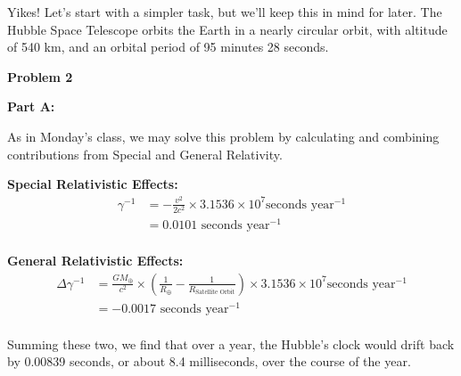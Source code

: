 \documentclass[12pt]{article}
\begin{document}
\begin{onehalfspacing}
Yikes! Let’s start with a simpler task, but we’ll keep this in mind for later. The Hubble Space Telescope orbits the Earth in a nearly circular orbit, with altitude of 540 km, and an orbital period of 95 minutes 28 seconds.
\fi

\raggedright{\textbf{\Large Problem 2}}\\
\raggedright{\textbf{\large Part A: }}

As in Monday's class, we may solve this problem by calculating and combining contributions from Special and General Relativity.

\bigskip

\textbf{Special Relativistic Effects:}
\begin{align*}
  \gamma^{-1} &= - \frac{v^2}{2 c^2} \times 3.1536 \times 10^7 \text{seconds year$^{-1}$}\\
              &= 0.0101 \text{ seconds year$^{-1}$}\\
\end{align*}


\textbf{General Relativistic Effects:}
\begin{align*}
  \Delta \gamma^{-1} &= \frac{G M_{\oplus}}{c^2} \times \left( \frac{1}{R_{\oplus}} - \frac{1}{R_{\text{Satellite Orbit}}} \right)  \times 3.1536 \times 10^7 \text{seconds year$^{-1}$}\\
                     &= -0.0017  \text{ seconds year$^{-1}$} \\
\end{align*}


Summing these two, we find that over a year, the Hubble's clock would drift back by 0.00839 seconds, or about 8.4 milliseconds, over the course of the year.

\bigskip
\bigskip


\end{onehalfspacing}
\end{document}
